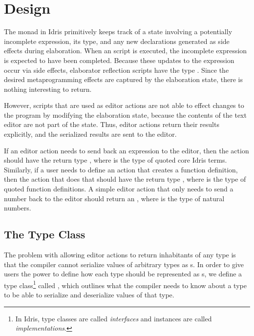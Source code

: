 \section{Design}\label{sec:design}

The \Elab{} monad in Idris primitively keeps track of a state
involving a potentially incomplete expression, its type, and any new declarations generated as
side effects during elaboration.
When an \Elab{} script is executed, the incomplete expression is expected to have been completed.
Because these updates to the expression occur via side effects, elaborator reflection scripts have the type \mbox{}. Since the
desired metaprogramming effects are captured by the elaboration state, there is
nothing interesting to return.

However, \Elab{} scripts that are used as editor actions are not able to effect changes to the program by modifying the elaboration state, because the contents of the text editor are not part of the state.
Thus, editor actions return their results explicitly, and the serialized results are sent to the editor.

If an editor action needs to send back an expression to the editor, then the
action should have the return type \mbox{}, where  is the type of
quoted core Idris terms.
Similarly, if a user needs to define an action that creates a function definition,
then the action that does that should have the return type \mbox{},
where  is the type of quoted function definitions.
A simple editor action that only needs to send a number back
to the editor should return an \mbox{}, where  is the
type of natural numbers.

\subsection{The \Editorable{} Type Class}
\label{ssec:editorable}

The problem with allowing editor actions to return inhabitants of any
type is that the compiler cannot serialize values of arbitrary types
as \sexp{}s.  In order
to give users the power to define how each type should
be represented as \sexp{}s, we define a type class\footnote{In Idris,
  type classes are called \emph{interfaces} and instances are called
  \emph{implementations}.}  called \Editorable{}, which outlines what
the compiler needs to know about a type to be able to serialize and
deserialize values of that type.

